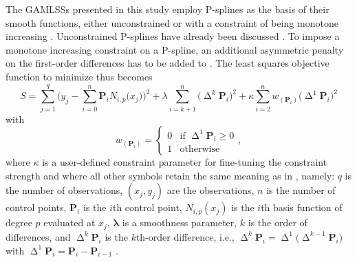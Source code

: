 The GAMLSSs presented in this study employ P-splines as the basis of their smooth functions, either unconstrained \parencite{Eilers1996} or with a constraint of being monotone increasing \parencite{Bollaerts2006}.  Unconstrained P-splines have already been discussed .  To impose a monotone increasing constraint on a P-spline, an additional asymmetric penalty on the first-order differences has to be added to .  The least squares objective function to minimize thus becomes
\begin{equation}
  \label{eq:PSplineOLSMonotoneIncreasingConstraint}
  S =
  \sum_{j = 1}^q 
  \Biggl(
  y_j - \sum_{i = 0}^n \symbf{P}_i N_{i, p}\bigl(x_j\bigr)
  \Biggr)^2
  + \lambda \sum_{i = k + 1}^n \bigl(\upDelta^k \symbf{P}_i\bigr)^2
  + \kappa \sum_{i = 2}^n w_{(\symbf{P}_i)}\bigl(\upDelta^1 \symbf{P}_i\bigr)^2
\end{equation}
with
\begin{equation}
  \label{eq:PSlineOLSMonotoneIncreasingConstraintWFunction}
  w_{(\symbf{P}_i)} =
  \begin{cases}
    0 &\text{if } \upDelta^1 \symbf{P}_i \geq 0 \\
    1 &\text{otherwise}
  \end{cases},
\end{equation}
where \(\kappa\) is a user-defined constraint parameter for fine-tuning the constraint strength and where all other symbols retain the same meaning as in , namely:
\(q\) is the number of observations,
\((x_j, y_j)\) are the observations,
\(n\) is the number of control points,
\(\symbf{P}_i\) is the \(i\)th control point,
\(N_{i, p}(x_j)\) is the \(i\)th basis function of degree \(p\) evaluated at \(x_j\),
\(\symbf{\lambda}\) is a smoothness parameter,
\(k\) is the order of differences,
and \(\upDelta^k \symbf{P}_i\) is the \(k\)th-order difference, i.e., \(\upDelta^k\symbf{P}_i = \upDelta^1 \bigl(\upDelta^{k - 1} \symbf{P}_i\bigr)\) with \(\upDelta^1 \symbf{P}_i = \symbf{P}_i - \symbf{P}_{i - 1}\) \parencite{Bollaerts2006}.

